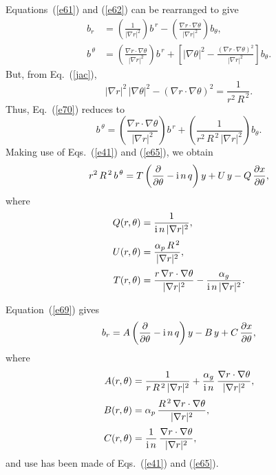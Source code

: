 \documentclass[12pt,prb,aps]{revtex4-1}
\begin{document}
Equations~(\ref{e61}) and (\ref{e62}) can be rearranged to give
\begin{align}
b_r &= \left(\frac{1}{|\nabla r|^2}\right)b^{\,r}- \left(\frac{\nabla r\cdot\nabla\theta}{|\nabla r|^2}\right)b_\theta,\label{e69}\\[0.5ex]
b^{\,\theta} &= \left(\frac{\nabla r\cdot\nabla\theta}{|\nabla r|^2}\right)b^{\,r} +\left[|\nabla\theta|^2 -\frac{(\nabla r\cdot\nabla\theta)^2}{|\nabla r|^2}\right]b_\theta.\label{e70}
\end{align}
But, from Eq.~(\ref{jac}), 
\begin{equation}
|\nabla r|^2\,|\nabla\theta|^2-(\nabla r \cdot\nabla\theta)^2 = \frac{1}{r^2\,R^{\,2}}.
\end{equation}
Thus, Eq.~(\ref{e70}) reduces to 
\begin{equation}\label{e58x}
b^{\,\theta} = \left(\frac{\nabla r\cdot\nabla\theta}{|\nabla r|^2}\right)b^{\,r} + \left(\frac{1}{r^2\,R^{\,2}\,|\nabla r|^2}\right) b_\theta.
\end{equation}
Making use of Eqs.~(\ref{e41}) and (\ref{e65}), we obtain
\begin{equation}\label{e74}
r^2\,R^{\,2}\,b^{\,\theta} = T\left(\frac{\partial}{\partial\theta}-{\rm i}\,n\,q\right)y + U\,y -Q\,\frac{\partial x}{\partial\theta},
\end{equation}
where
\begin{align}
Q(r,\theta)&= \frac{1}{{\rm i}\,n\,|\nabla r|^2},\label{eq}\\[0.5ex]
U(r,\theta)&= \frac{\alpha_p\,R^{\,2}}{|\nabla r|^2},\label{eu}\\[0.5ex]
T(r,\theta)&= \frac{r\,\nabla r\cdot\nabla\theta}{|\nabla r|^2}-\frac{\alpha_g}{{\rm i}\,n\,|\nabla r|^2}.\label{et}
\end{align}

Equation~(\ref{e69}) gives
\begin{equation}\label{e76}
b_r = A\left(\frac{\partial}{\partial\theta}-{\rm i}\,n\,q\right)y - B\,y + C\,\frac{\partial x}{\partial\theta},
\end{equation}
where
\begin{align}
A(r,\theta)&= \frac{1}{r\,R^{\,2}\,|\nabla r|^2}+\frac{\alpha_g}{{\rm i}\,n}\,\frac{\nabla r\cdot\nabla\theta}{|\nabla r|^2},\\[0.5ex]
B(r,\theta)&= \alpha_p\,\frac{R^{\,2}\,\nabla r\cdot\nabla\theta}{|\nabla r|^2},\\[0.5ex]
C(r,\theta)&= \frac{1}{{\rm i}\,n}\,\frac{\nabla r\cdot\nabla\theta}{|\nabla r|^2},
\end{align}
and use has been made of Eqs.~(\ref{e41}) and (\ref{e65}).
\end{document}
